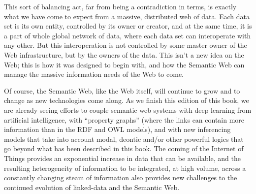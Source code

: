 This sort of balancing act, far from being a contradiction in terms, is exactly what we have come
to expect from a massive, distributed 
web of data.  Each data set is its own entity, controlled by its owner or creator, and at the same time, it is a 
part of whole global network of data,  where each data set can interoperate with any other. 
But this  interoperation is not controlled by some master owner of the Web infrastructure, but by the owners of the
data.  This isn't a new idea on the Web; this is how it was designed to begin with, and how the Semantic Web can 
manage the massive information needs of the Web to come. 

Of course, the Semantic Web, like the Web itself, will continue to grow and to change as new technologies come along. 
As we finish this edition of this book, we are already seeing efforts to couple semantic web systems with deep 
learning from artificial intelligence, with ``property graphs'' (where the links can contain more information than
in the RDF and OWL models), and with new inferencing models that take into account modal, deontic 
and/or other powerful logics that go beyond what has been described in this book.  The coming of the 
Internet of Things provides an exponential increase in data that can be available, and the resulting heterogeneity
of information to be integrated, at high volume, across a constantly changing steam of information also
provides new challenges to the continued evolution of linked-data and the Semantic Web.  
